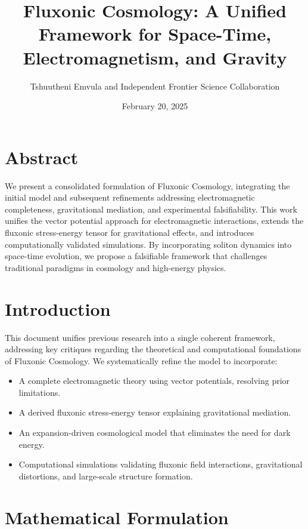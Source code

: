 \documentclass{article}
\title{Fluxonic Cosmology: A Unified Framework for Space-Time, Electromagnetism, and Gravity}
\author{Tshuutheni Emvula and Independent Frontier Science Collaboration}
\date{February 20, 2025}
\begin{document}
\maketitle

\section*{Abstract}
We present a consolidated formulation of Fluxonic Cosmology, integrating the initial model and subsequent refinements addressing electromagnetic completeness, gravitational mediation, and experimental falsifiability. This work unifies the vector potential approach for electromagnetic interactions, extends the fluxonic stress-energy tensor for gravitational effects, and introduces computationally validated simulations. By incorporating soliton dynamics into space-time evolution, we propose a falsifiable framework that challenges traditional paradigms in cosmology and high-energy physics.

\section{Introduction}
This document unifies previous research into a single coherent framework, addressing key critiques regarding the theoretical and computational foundations of Fluxonic Cosmology. We systematically refine the model to incorporate:
\begin{itemize}
    \item A complete electromagnetic theory using vector potentials, resolving prior limitations.
    \item A derived fluxonic stress-energy tensor explaining gravitational mediation.
    \item An expansion-driven cosmological model that eliminates the need for dark energy.
    \item Computational simulations validating fluxonic field interactions, gravitational distortions, and large-scale structure formation.
\end{itemize}

\section{Mathematical Formulation}
\end{document}
